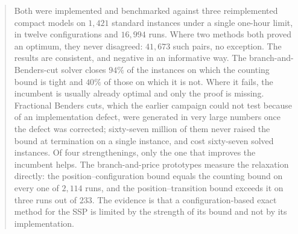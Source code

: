 \begin{abstract}
Both were implemented and benchmarked against three reimplemented compact models on
$1{,}421$ standard instances under a single one-hour limit, in twelve configurations
and $16{,}994$ runs. Where two methods both proved an optimum, they never disagreed:
$41{,}673$ such pairs, no exception. The results are consistent, and negative in an
informative way. The branch-and-Benders-cut solver closes $94\%$ of the instances on
which the counting bound is tight and $40\%$ of those on which it is not. Where it
fails, the incumbent is usually already optimal and only the proof is missing.
Fractional Benders cuts, which the earlier campaign could not test because of an
implementation defect, were generated in very large numbers once the defect was
corrected; sixty-seven million of them never raised the bound at termination on a
single instance, and cost sixty-seven solved instances. Of four strengthenings, only
the one that improves the incumbent helps. The branch-and-price prototypes measure the
relaxation directly: the position--configuration bound equals the counting bound on
every one of $2{,}114$ runs, and the position--transition bound exceeds it on three
runs out of $233$. The evidence is that a configuration-based exact method for the SSP
is limited by the strength of its bound and not by its implementation.
\end{abstract}
